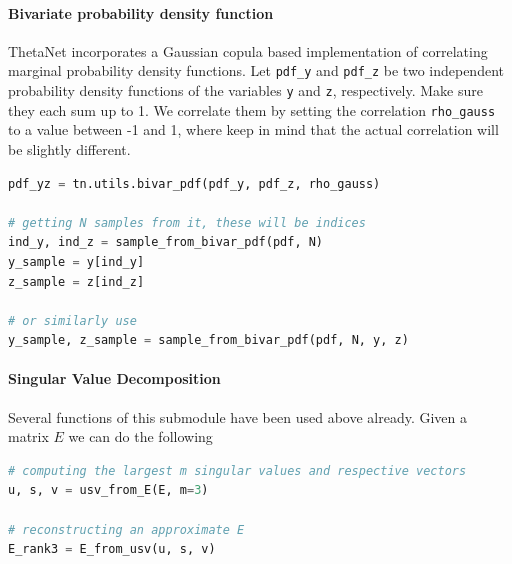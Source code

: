\documentclass[bibliography=totoc, twoside]{article}
\numberwithin{equation}{section}
\begin{document}
\paragraph*{Bivariate probability density function}
ThetaNet incorporates a Gaussian copula based implementation of correlating marginal probability density functions.
Let \texttt{pdf\_y} and \texttt{pdf\_z} be two independent probability density functions of the variables \texttt{y} and \texttt{z}, respectively.
Make sure they each sum up to 1.
We correlate them by setting the correlation \texttt{rho\_gauss} to a value between -1 and 1, where keep in mind that the actual correlation will be slightly different.
\begin{lstlisting}[language=python]
pdf_yz = tn.utils.bivar_pdf(pdf_y, pdf_z, rho_gauss)

# getting N samples from it, these will be indices
ind_y, ind_z = sample_from_bivar_pdf(pdf, N)
y_sample = y[ind_y]
z_sample = z[ind_z]

# or similarly use
y_sample, z_sample = sample_from_bivar_pdf(pdf, N, y, z)
\end{lstlisting}


\paragraph*{Singular Value Decomposition}
Several functions of this submodule have been used above already.
Given a matrix $E$ we can do the following
\begin{lstlisting}[language=python]
# computing the largest m singular values and respective vectors
u, s, v = usv_from_E(E, m=3)

# reconstructing an approximate E
E_rank3 = E_from_usv(u, s, v)
\end{lstlisting}
\end{document}
